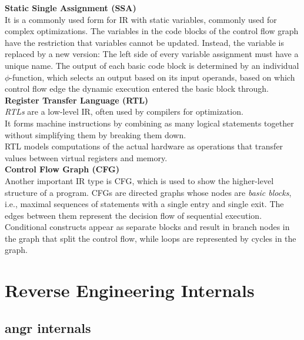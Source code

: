 \documentclass[seminar]{plai}
\begin{document}
\noindent\textbf{Static Single Assignment (SSA)}\\
It is a commonly used form for IR with static variables, commonly used for complex optimizations. The variables in the code blocks of the control flow graph have the restriction that variables cannot be updated. Instead, the variable is replaced by a new version:\cite{introduction-to-compilers-and-language-design}
The left side of every variable assignment must have a unique name.
The output of each basic code block is determined by an individual $\phi$-function, which selects an output based on its input operands, based on which control flow edge the dynamic execution entered the basic block through.\cite{interpreting-programs-in-SSA-form}\\

\noindent\textbf{Register Transfer Language (RTL)}\\
\textit{RTLs} are a low-level IR, often used by compilers for optimization.\\
It forms machine instructions by combining as many logical statements together without simplifying them by breaking them down.\\
RTL models computations of the actual hardware as operations that transfer values between virtual registers and memory.\cite{The-RTL-System-A-Framework-for-Code-Optimization}\\

\noindent\textbf{Control Flow Graph (CFG)}\\
Another important IR type is CFG, which is used to show the higher-level structure of a program. CFGs are directed graphs whose nodes are \textit{basic blocks}, i.e., maximal sequences of statements with a single entry and single exit. The edges between them represent the decision flow of sequential execution. Conditional constructs appear as separate blocks and result in branch nodes in the graph that split the control flow, while loops are represented by cycles in the graph.\cite{introduction-to-compilers-and-language-design}
\section{Reverse Engineering Internals}
\label{sec:reverse-engineering-internals}

\subsection{angr internals}
\label{sec:angr-internals}
\end{document}
